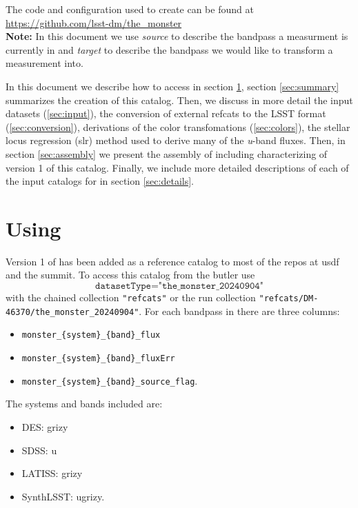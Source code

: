 The code and configuration used to create \monster can be found at \url{https://github.com/lsst-dm/the_monster}\\

\textbf{Note:} In this document we use \emph{source} to describe the bandpass a measurment is currently in and \emph{target} to describe the bandpass we would like to transform a measurement into. 

In this document we describe how to access \monster in section \ref{sec:using}, section \ref{sec:summary} summarizes the creation of this catalog. Then, we discuss in more detail the input datasets (\ref{sec:input}), the 
conversion of external refcats to the LSST format (\ref{sec:conversion}), derivations of the color transfomations (\ref{sec:colors}), the stellar locus regression (slr) method used to derive many of the \emph{u}-band fluxes. 
Then, in section \ref{sec:assembly} we present the assembly of \monster including characterizing of version 1 of this catalog. 
Finally, we include more detailed descriptions of each of the input catalogs for \monster in section \ref{sec:details}. 

\section{Using \monster}
\label{sec:using}
Version 1 of \monster  has been added as a reference catalog to most of the repos at usdf and the summit. 
To access this catalog from the butler use
$$\texttt{datasetType="the\_monster\_20240904"}$$ 
with the chained collection \texttt{"refcats"} or the run collection \texttt{"refcats/DM-46370/the\_monster\_20240904"}. 
For each bandpass in \monster there are three columns: 
\begin{itemize}
    \item \texttt{monster\_\{system\}\_\{band\}\_flux} 
    \item \texttt{monster\_\{system\}\_\{band\}\_fluxErr} 
    \item \texttt{monster\_\{system\}\_\{band\}\_source\_flag}.
\end{itemize}

The systems and bands included are:
\begin{itemize}
    \item DES: grizy
    \item SDSS: u
    \item LATISS: grizy
    \item SynthLSST: ugrizy.
\end{itemize}

